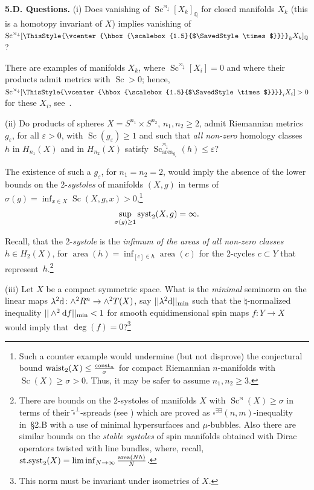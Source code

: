 \documentclass[pdftex]{sigma}
\numberwithin{equation}{section}
\newcommand\bigtimes{\mathbin{\ThisStyle{\vcenter{\hbox{%
\scalebox{1.5}{$\SavedStyle\times$}}}}}}
\begin{document}
 \textbf {5.D. Questions.} (i) Does vanishing of $\operatorname{Sc}^{\rtimes_\downarrow} [X_k]_{\mathbb Q}$ for closed manifolds $X_k$ (this is a homotopy invariant of $X$)
 implies vanishing of $\operatorname{Sc}^{\rtimes_\downarrow} [\bigtimes_kX_k]_{\mathbb Q}$?

There are examples of manifolds $X_k$, where
$\operatorname{Sc}^{\rtimes_\downarrow} [X_i]=0$ and where their products admit metrics with $\operatorname{Sc}>0$; hence,
 $\operatorname{Sc}^{\rtimes_\downarrow} [\bigtimes_iX_i]>0 $ for these $X_i$, see~\cite{GH2023}.

(ii) Do products of
spheres $X=S^{n_1}\times S^{n_2}$, $n_1,n_2\geq 2$, admit Riemannian metrics $g_\varepsilon$, for all $\varepsilon>0$, with $\operatorname{Sc}(g_\varepsilon)\geq 1$ and such that {\it all non-zero} homology classes $h$ in $H_{n_1}(X)$ and in $H_{n_2}(X)$ satisfy
$\operatorname{Sc}_{\operatorname{area}_{ g_\varepsilon}}^{\rtimes_\downarrow} (h)\leq \varepsilon$?

The existence of such a $g_\varepsilon$, for $n_1=n_2=2$, would imply
the absence of the lower bounds on the 2-{\it systoles} of manifolds $(X, g)$ in terms of $\sigma(g)=\inf_{x\in X} \operatorname{Sc} (X,g,x)>0$,\footnote{Such a counter example would undermine (but not disprove) the conjectural bound ${\rm waist}_2(X)\leq \frac{{\rm const}_n}{\sigma}$ for compact Riemannian $n$-manifolds with $\operatorname{Sc}(X)\geq \sigma>0$. Thus, it may be safer
to assume $n_1,n_2\geq 3$.}
\[
\sup_{\sigma(g)\geq 1} {\rm syst}_2(X, g)= \infty.
\]

Recall, that the 2-{\it systole} is the {\it infimum of the areas of all non-zero classes} $h\in H_2(X)$, for $\operatorname{area}(h)=\inf_{[c]\in h} \operatorname{area}(c)$ for the 2-cycles $c\subset Y$ that represent~$h$.\footnote{There are bounds on the 2-systoles of manifolds $X$ with $\operatorname{Sc}^\rtimes (X)\geq \sigma$ in terms of their $\tilde \square^\perp$-spreads (see
\cite{Ri2020, Ze2020}) which are proved as $\square^{\exists\exists}(n,m)$-inequality in~\S2.B with a use of minimal hypersurfaces and $\mu$-bubbles.
 Also there are similar bounds on the {\it stable systoles} of spin manifolds obtained with Dirac operators twisted with line bundles, where, recall,
 ${\rm st.syst}_2(X)=\liminf_{N\to \infty} \frac{\operatorname{area}(Nh)}{N}$.}

 (iii) Let $X$ be a compact symmetric space. What is the {\it minimal}
 seminorm on the linear maps $\lambda^2{\rm d}\colon  \mathbb \wedge^2R^n\to \wedge^2T(X)$,
say $||\lambda^2{\rm d}||_{\min}$ such that
 the $\natural$-normalized inequality $||\wedge^2{\rm d}f||_{\min} < 1$ for smooth equidimensional spin maps $f\colon Y\to X$ would imply
 that $\deg(f)=0$?\footnote{This norm must be invariant under isometries of $X$.}
\end{document}
